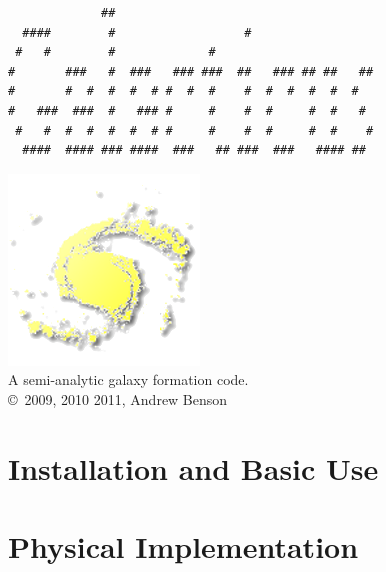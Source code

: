 \documentclass[letterpaper,10pt]{book}
\begin{document}
\lstset{language=[95]Fortran}

\frontmatter

\pagestyle{empty}
\begin{center}
\begin{minipage}{9.5cm}
\begin{verbatim}
             ##                                     
  ####        #                  #                  
 #   #        #             #                       
#       ###   #  ###   ### ###  ##   ### ## ##   ## 
#       #  #  #  #  # #  #  #    #  #  #  #  #  #   
#   ###  ###  #   ### #     #    #  #     #  #   #  
 #   #  #  #  #  #  # #     #    #  #     #  #    # 
  ####  #### ### ####  ###   ## ###  ###   #### ##  

\end{verbatim}
\end{minipage}

\includegraphics{New_Logo_Galaxy_192_Transparent.png}\\
A semi-analytic galaxy formation code.\\

\copyright\ 2009, 2010 2011, Andrew Benson
\end{center}

\tableofcontents

\mainmatter

\part{Installation and Basic Use}















\part{Physical Implementation}
\end{document}
